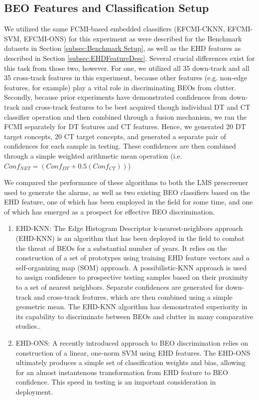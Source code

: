 \documentclass[12pt,dvips]{report}
\numberwithin{equation}{section}
\begin{document}
\subsection{BEO Features and Classification Setup} \label{subsec:BEODataset}
We utilized the same FCMI-based embedded classifiers (EFCMI-CKNN, EFCMI-SVM, EFCMI-ONS) for this experiment as were described for the Benchmark datasets in Section \ref{subsec:Benchmark Setup}, as well as the EHD features as described in Section \ref{subsec:EHDFeatureDesc}.  Several crucial differences exist for this task from those two, however.  For one, we utilized all 35 down-track and all 35 cross-track features in this experiment, because other features (e.g. non-edge features, for example) play a vital role in discriminating BEOs from clutter.  Secondly, because prior experiments have demonstrated confidences from down-track and cross-track features to be best acquired though individual DT and CT classifier operation and then combined through a fusion mechanism, we ran the FCMI separately for DT features and CT features.  Hence, we generated 20 DT target concepts, 20 CT target concepts, and generated a separate pair of confidences for each sample in testing.  These confidences are then combined through a simple weighted arithmetic mean operation (i.e. $Conf_{NET}=(Conf_{DT}+ 0.5(Conf_{CT}))$)

We compared the performance of these algorithms to both the LMS prescreener used to generate the alarms, as well as two existing BEO classifiers based on the EHD feature, one of which has been employed in the field for some time, and one of which has emerged as a prospect for effective BEO discrimination.

\begin{enumerate}

	\item EHD-KNN: The Edge Histogram Descriptor k-nearest-neighbors approach (EHD-KNN) \cite{friguipaul2009} is an algorithm that has been deployed in the field to combat the threat of BEOs for a substantial number of years.  It relies on the construction of a set of prototypes using training EHD feature vectors and a self-organizing map (SOM) \cite{kohonen1997exploration} approach.  A possibilistic-KNN approach is used to assign confidence to prospective testing samples based on their proximity to a set of nearest neighbors.  Separate confidences are generated for down-track and cross-track features, which are then combined using a simple geometric mean.  The EHD-KNN algorithm has demonstrated superiority in its capability to discriminate between BEOs and clutter in many comparative studies.\cite{karem2010comparison,ratto2010context,ho2004improving}.  
	\item EHD-ONS: A recently introduced approach to BEO discrimination relies on construction of a linear, one-norm SVM using EHD features.  The EHD-ONS ultimately produces a simple set of classification weights and bias, allowing for an almost instantenous transformation from EHD feature to BEO confidence.  This speed in testing is an important consideration in deployment.
\end{enumerate}
\end{document}
